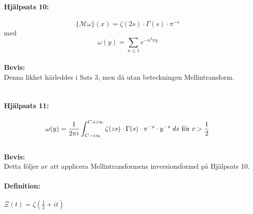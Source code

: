\documentclass[a4paper]{article}%
\begin{document}
\paragraph{Hjälpsats 10:} 
\[
	\{\mathcal{M} \omega \} (x) = \zeta(2s) \cdot \Gamma(s) \cdot \pi^{-s}
\]
med 
\[
	\omega(y) = \sum\limits_{n \leq 1} e^{-n^2\pi y}
\]
\\
{\bf Bevis:} \\ 
Denna likhet härleddes i Sats 3, men då utan beteckningen Mellintransform.\\
\\
\paragraph{Hjälpsats 11:} 
\[
	\omega(y) = \frac {1} {2\pi i} \int_{C - i \infty}^{C + i \infty} \zeta(zs) \cdot \Gamma(s) \cdot \pi^{-s} \cdot
		y^{-s} \; ds \text{ för } c > \frac 1 2
\] 
\\
{\bf Bevis:}\\
Detta följer av att applicera Mellintransformens inversionsformel på Hjälpsats 10.\\

\paragraph{Definition:} $\Xi(t) = \zeta(\frac 1 2 + it)$ \\
\\
\newcommand{\helper}[1] {
	\int_#1^\infty (t^2 + \frac 1 4)^{-1}
}
\newcommand{\twelve}[1][0] {
	\helper{#1} \cdot \cos(xt) \; dt
}
\end{document}
